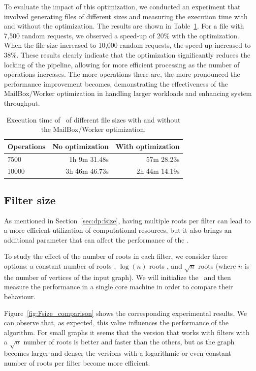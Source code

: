     To evaluate the impact of this optimization, we conducted an experiment that involved generating files of different sizes and measuring the execution time with and without the optimization. The results are shown in Table~\ref{tab:messenger}. For a file with 7,500 random requests, we observed a speed-up of 20\% with the optimization. When the file size increased to 10,000 random requests, the speed-up increased to 38\%. These results clearly indicate that the optimization significantly reduces the locking of the pipeline, allowing for more efficient processing as the number of operations increases. The more operations there are, the more pronounced the performance improvement becomes, demonstrating the effectiveness of the MailBox/Worker optimization in handling larger workloads and enhancing system throughput.

    \begin{table}[H]
    \centering
    \begin{tabular}{@{}lrr@{}}
    \toprule
    Operations & No optimization & With optimization \\ \midrule
    7500       & 1h 9m 31.48s    & 57m 28.23s        \\
    10000      & 3h 46m 46.73s   & 2h 44m 14.19s     \\ \bottomrule
    \end{tabular}
    \caption{Execution time of \DPmst\ of different file sizes with and without the MailBox/Worker optimization.\label{tab:messenger}}
    \end{table}
            
    \subsection*{Filter size \label{sec:filter_size}}
    As mentioned in Section~\ref{sec:dp:fsize}, having multiple roots per filter can lead to a more efficient utilization of computational resources, but it also brings an additional parameter that can affect the performance of the \DPmst.

    To study the effect of the number of roots in each filter, we consider three options: a constant number of roots ,  $\log(n)$ roots , and $\sqrt{n}$ roots  (where $n$ is the number of vertices of the input graph). We will initialize the \DPmst\ and then measure the performance in a single core machine in order to compare their behaviour.

    Figure~\ref{fig:Fsize_comparison} shows the corresponding experimental results. We can observe that, as expected, this value influences the performance of the algorithm. For small graphs it seems that the version that works with filters with a $\sqrt{n}$ number of roots is better and faster than the others, but as the graph becomes larger and denser the versions with a logarithmic or even constant number of roots per filter become more efficient.
        
